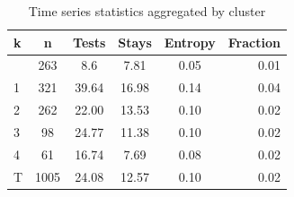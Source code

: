 \begin{table}[ht]
\caption{Time series statistics aggregated by cluster}
\label{stats}
\vskip 0.15in
\begin{center}
\begin{small}
\begin{sc}
\begin{tabular}{lccccr}
\hline
\abovespace\belowspace
k 	&n 	&Tests 	&Stays 	&Entropy 	&Fraction \\
\hline
\abovespace
0	&263	&8.6	&7.81	&0.05	&0.01\\
1	&321	&39.64	&16.98	&0.14	&0.04\\
2	&262	&22.00	     &13.53	&0.10	&0.02\\
3	&98	    &24.77	&11.38	&0.10	&0.02\\
4	&61	    &16.74	&7.69	&0.08	&0.02\\
\belowspace
T 	&1005	&24.08	&12.57	&0.10	&0.02\\
\hline
\end{tabular}
\end{sc}
\end{small}
\end{center}
\vskip -0.1in
\end{table}



